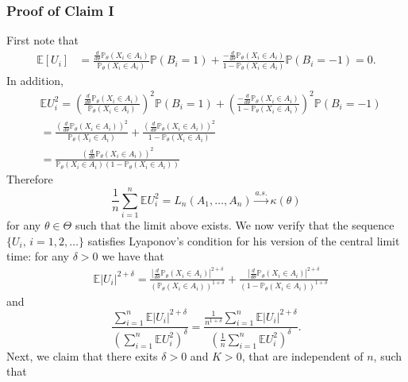 \documentclass[letterpaper, 11pt]{IEEEtran}      %
\newcommand{\Prob}{\mathbb{P} }
\begin{document}
\subsubsection*{Proof of Claim I}
First note that 
\begin{align*}
\mathbb E  [U_i] & = 
 \frac{\frac{d}{d\theta} \Prob_{\theta}(X_i \in A_i)}{\Prob_{\theta}(X_i \in A_i)}   \Prob (B_i=1)   + 
 \frac{-\frac{d}{d\theta} \Prob_{\theta}(X_i \in A_i)}{1-\Prob_{\theta}(X_i \in A_i)}   \Prob (B_i=-1)  = 0. 
\end{align*}
In addition,
\begin{align*}
& \mathbb E U_i^2 = 
\left( \frac{\frac{d}{d\theta} \Prob_{\theta}(X_i \in A_i)}{\Prob_{\theta}(X_i \in A_i)}  \right)^2  \Prob (B_i=1)   + 
\left( \frac{-\frac{d}{d\theta} \Prob_{\theta}(X_i \in A_i)}{1-\Prob_{\theta}(X_i \in A_i)}  \right)^2 \Prob (B_i=-1) \\
& =
 \frac{ \left(\frac{d}{d\theta} \Prob_{\theta}(X_i \in A_i) \right)^2}{\Prob_{\theta}(X_i \in A_i)} +  
  \frac{ \left(\frac{d}{d\theta} \Prob_{\theta}(X_i \in A_i) \right)^2}{1-\Prob_{\theta}(X_i \in A_i)} \\
 & =  
  \frac{ \left(\frac{d}{d\theta} \Prob_{\theta}(X_i \in A_i) \right)^2}{\Prob_{\theta}(X_i \in A_i) \left(1-\Prob_{\theta}(X_i \in A_i) \right)} 
\end{align*}
Therefore
\[
\frac{1}{n} \sum_{i=1}^n \mathbb E U_i^2 = L_n(A_1,\ldots,A_n) \overset{a.s.}{\longrightarrow} \kappa(\theta)
\]
for any $\theta \in \Theta$ such that the limit above exists. We now verify that the sequence $\{ U_i,\,i=1,2,\ldots \}$ satisfies Lyaponov's condition for his version of the central limit time: for any $\delta>0$ we have that 
\begin{align*}
& \mathbb E \left| U_i \right|^{2+\delta} =
 \frac{ \left| \frac{d}{d\theta} \Prob_{\theta}(X_i \in A_i) \right|^{2+\delta}} {(\Prob_{\theta}(X_i \in A_i))^{1+\delta}} +  
  \frac{ \left|\frac{d}{d\theta} \Prob_{\theta}(X_i \in A_i) \right|^{2+\delta}} {(1-\Prob_{\theta}(X_i \in A_i))^{1+\delta}} 
\end{align*}
and
\begin{equation}
\frac{\sum_{i=1}^n \mathbb E \left| U_i \right|^{2+\delta} } { \left( \sum_{i=1}^n \mathbb E U_i^2  \right)^\delta} = 
\frac{ \frac{1}{n^{1+\delta}} \sum_{i=1}^n \mathbb E |U_i|^{2+\delta} }{ \left(\frac{1}{n} \sum_{i=1}^n \mathbb E U_i^2  \right)^\delta}. 
\label{eq:Lyaponov}
\end{equation}
Next, we claim that there exits $\delta>0$ and $K>0$, that are independent of $n$, such that
\end{document}
